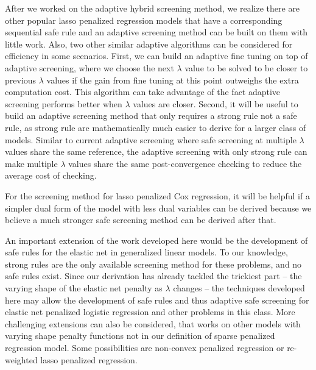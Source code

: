 After we worked on the adaptive hybrid screening method, we realize there are other popular lasso penalized regression models that have a corresponding sequential safe rule and an adaptive screening method can be built on them with little work. Also, two other similar adaptive algorithms can be considered for efficiency in some scenarios. First, we can build an adaptive fine tuning on top of adaptive screening, where we choose the next $\lambda$ value to be solved to be closer to previous $\lambda$ values if the gain from fine tuning at this point outweighs the extra computation cost. This algorithm can take advantage of the fact adaptive screening performs better when $\lambda$ values are closer. Second, it will be useful to build an adaptive screening method that only requires a strong rule not a safe rule, as strong rule are mathematically much easier to derive for a larger class of models. Similar to current adaptive screening where safe screening at multiple $\lambda$ values share the same reference, the adaptive screening with only strong rule can make multiple $\lambda$ values share the same post-convergence checking to reduce the average cost of checking.

For the screening method for lasso penalized Cox regression, it will be helpful if a simpler dual form of the model with less dual variables can be derived because we believe a much stronger safe screening method can be derived after that.

An important extension of the work developed here would be the development of safe rules for the elastic net in generalized linear models. To our knowledge, strong rules are the only available screening method for these problems, and no safe rules exist. Since our derivation has already tackled the trickiest part -- the varying shape of the elastic net penalty as $\lambda$ changes -- the techniques developed here may allow the development of safe rules and thus adaptive safe screening for elastic net penalized logistic regression and other problems in this class. More challenging extensions can also be considered, that works on other models with varying shape penalty functions not in our definition of sparse penalized regression model. Some possibilities are non-convex penalized regression or re-weighted lasso penalized regression.


